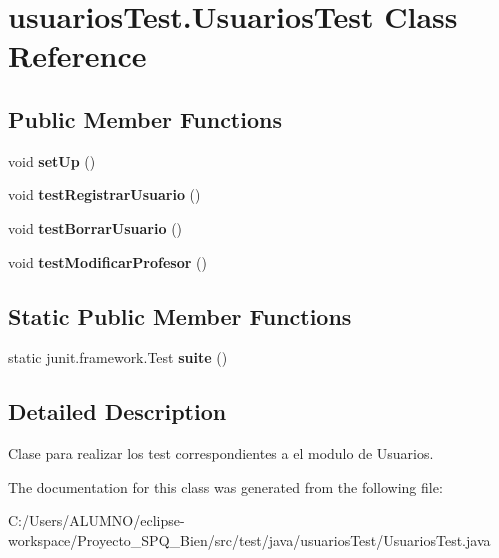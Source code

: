 \hypertarget{classusuarios_test_1_1_usuarios_test}{}\section{usuarios\+Test.\+Usuarios\+Test Class Reference}
\label{classusuarios_test_1_1_usuarios_test}
\subsection*{Public Member Functions}
\begin{DoxyCompactItemize}
\item 
\mbox{\label{classusuarios_test_1_1_usuarios_test_a106e391b8f4db63232de5af21b046a92}} 
void {\bfseries set\+Up} ()
\item 
\mbox{\label{classusuarios_test_1_1_usuarios_test_a1cc7049a21b0698c1756552670057635}} 
void {\bfseries test\+Registrar\+Usuario} ()
\item 
\mbox{\label{classusuarios_test_1_1_usuarios_test_ac0922dd866da804a9a2f4f918e22e65e}} 
void {\bfseries test\+Borrar\+Usuario} ()
\item 
\mbox{\label{classusuarios_test_1_1_usuarios_test_afa751106be2d4bef877adc537b737cbc}} 
void {\bfseries test\+Modificar\+Profesor} ()
\end{DoxyCompactItemize}
\subsection*{Static Public Member Functions}
\begin{DoxyCompactItemize}
\item 
\mbox{\label{classusuarios_test_1_1_usuarios_test_a69807a78bbe867e53f465aa78ec80d7e}} 
static junit.\+framework.\+Test {\bfseries suite} ()
\end{DoxyCompactItemize}


\subsection{Detailed Description}
Clase para realizar los test correspondientes a el modulo de Usuarios. 

The documentation for this class was generated from the following file\+:\begin{DoxyCompactItemize}
\item 
C\+:/\+Users/\+A\+L\+U\+M\+N\+O/eclipse-\/workspace/\+Proyecto\+\_\+\+S\+P\+Q\+\_\+Bien/src/test/java/usuarios\+Test/Usuarios\+Test.\+java\end{DoxyCompactItemize}
